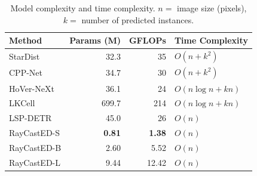 \begin{table}[H]
\centering
\caption{Model complexity and time complexity. $n =$ image size (pixels), $k =$ number of predicted instances.}
\label{tab:benchmark-efficiency}
\begin{tabular}{l r r l}
\hline
\textbf{Method} & \textbf{Params (M)} & \textbf{GFLOPs} & \textbf{Time Complexity} \\
\hline
StarDist~\cite{schmidt2018cell}    & 32.3  & 35   & $O(n + k^2)$ \\
CPP-Net~\cite{chen2023cppnet}      & 34.7  & 30   & $O(n + k^2)$ \\
HoVer-NeXt~\cite{baumann2024hovernext} & 36.1  & 24   & $O(n \log n + kn)$ \\
LKCell~\cite{cui2024lkcell}        & 699.7 & 214  & $O(n \log n + kn)$ \\
LSP-DETR~\cite{pekar2026lsp}       & 45.0  & 26   & $O(n)$ \\
RayCastED-S & \textbf{0.81}  & \textbf{1.38}  & $O(n)$ \\
RayCastED-B & 2.60   & 5.52  & $O(n)$ \\
RayCastED-L & 9.44   & 12.42 & $O(n)$ \\
\hline
\end{tabular}
\end{table}
